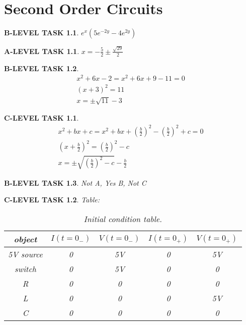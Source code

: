 \documentclass{book}
\numberwithin{equation}{section}
\newtheorem{alevel}{A-LEVEL TASK}
\newtheorem{blevel}{B-LEVEL TASK}
\newtheorem{clevel}{C-LEVEL TASK}
\theoremstyle{definition}
\begin{document}
\setcounter{alevel}{0} \setcounter{blevel}{0} \setcounter{clevel}{0} \setcounter{dlevel}{0}
\chapter{Second Order Circuits}
\begin{blevel}$e^{x}(5e^{-2y}-4e^{2y})$\end{blevel}
\begin{alevel}$x=-\frac{5}{2} \pm \frac{\sqrt{29}}{2}$\end{alevel}
\begin{blevel}\begin{align*}
x^2+6x-2 = x^2+6x+9-11=0\\
(x+3)^2=11\\
x=\pm \sqrt{11}-3
\end{align*}
\end{blevel}
\begin{clevel}\begin{align*}
x^2+bx+c = x^2+bx+(\frac{b}{2})^2-(\frac{b}{2})^2+c=0\\
(x+\frac{b}{2})^2=(\frac{b}{2})^2-c\\
x=\pm \sqrt{(\frac{b}{2})^2-c}-\frac{b}{2}
\end{align*}
\end{clevel}
\begin{blevel}Not A, Yes B, Not C\end{blevel}

\begin{clevel} Table:\par
\begin{table}[H]
\begin{center}
\begin{tabular}{|c|c|c|c|c|} \hline
object	&$I(t=0_{-})$	&$V(t=0_{-})$	&$I(t=0_{+})$	&$V(t=0_{+})$ \\ \hline
5V source&0&5V&0&5V \\ \hline
switch&0&5V&0&0 \\ \hline
R&0&0&0&0 \\ \hline
L&0&0&0&5V \\ \hline
C&0&0&0&0 \\ \hline
\end{tabular}
\caption{Initial condition table.}
\label{T:ic}
\end{center}
\end{table}
\end{clevel}
\end{document}
